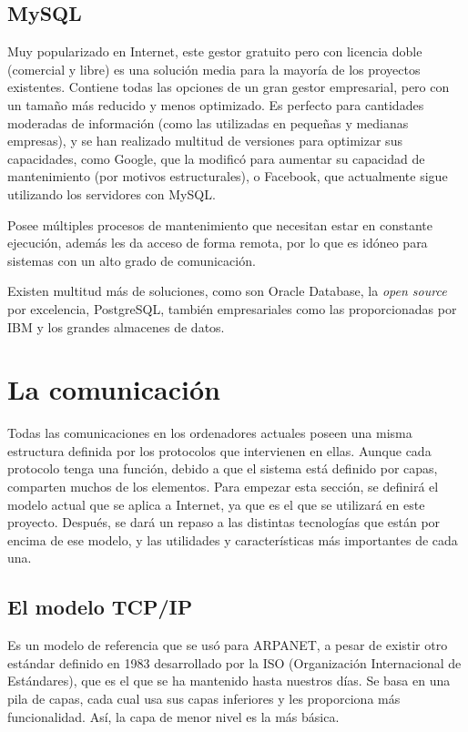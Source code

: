 \subsection{MySQL }
Muy popularizado en Internet, este gestor gratuito pero con licencia 
doble (comercial y libre) es una solución media para la mayoría de 
los proyectos existentes. Contiene todas las opciones de un gran 
gestor empresarial, pero con un tamaño más reducido y menos 
optimizado. Es perfecto para cantidades moderadas de información (como 
las utilizadas en pequeñas y medianas empresas), y se han realizado 
multitud de versiones para optimizar sus capacidades, como Google, que 
la modificó para aumentar su capacidad de mantenimiento (por motivos 
estructurales), o Facebook, que actualmente sigue utilizando los 
servidores con MySQL.

Posee múltiples procesos de mantenimiento que necesitan estar en 
constante ejecución, además les da acceso de forma remota, por 
lo que es idóneo para sistemas con un alto grado de comunicación.

Existen multitud más de soluciones, como son Oracle Database, la 
\emph{open source} por excelencia, PostgreSQL, también empresariales como 
las proporcionadas por IBM y los grandes almacenes de datos.

\section{La comunicación}
\label{sec:comunicacion}
Todas las comunicaciones en los ordenadores actuales poseen una misma 
estructura definida por los protocolos que intervienen en ellas. 
Aunque cada protocolo tenga una función, debido a que el sistema está 
definido por capas, comparten muchos de los elementos. Para empezar 
esta sección, se definirá el modelo actual que se aplica a Internet, 
ya que es el que se utilizará en este proyecto. Después, se dará un 
repaso a las distintas tecnologías que están por encima de ese 
modelo, y las utilidades y características más importantes de cada una.

\subsection{El modelo TCP/IP}
\label{subsec:tcpip}
Es un modelo de referencia que se usó para ARPANET, a pesar de existir 
otro estándar definido en 1983 desarrollado por la ISO (Organización 
Internacional de Estándares), que es el que se ha mantenido hasta nuestros 
días. Se basa en una pila de capas, cada cual usa sus capas inferiores 
y les proporciona más funcionalidad. Así, la capa de menor nivel es 
la más básica.

